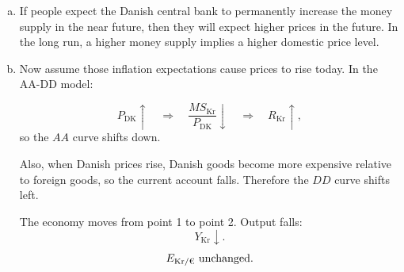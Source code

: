 \documentclass[11pt]{article}
\newenvironment{problem}[2][Problem]{\begin{trivlist}
\item[\hskip \labelsep {\bfseries #1}\hskip \labelsep {\bfseries #2.}]
\leavevmode\par
}{\end{trivlist}}
\newcommand{\Ekr}{E_{\text{Kr}/\text{\texteuro}}}
\begin{document}
\begin{problem}{2}

\begin{enumerate}[(a)]

\item If people expect the Danish central bank to permanently increase the money supply in the near future, then they will expect higher prices in the future. In the long run, a higher money supply implies a higher domestic price level.

\item Now assume those inflation expectations cause prices to rise today. In the AA-DD model:

\[
P_{\text{DK}}\uparrow
\quad \Rightarrow \quad
\frac{MS_{\text{Kr}}}{P_{\text{DK}}}\downarrow
\quad \Rightarrow \quad
R_{\text{Kr}}\uparrow,
\]
so the \(AA\) curve shifts down.

Also, when Danish prices rise, Danish goods become more expensive relative to foreign goods, so the current account falls. Therefore the \(DD\) curve shifts left.

\begin{center}
\end{center}

The economy moves from point 1 to point 2. Output falls:
\[
Y_{\text{Kr}}\downarrow.
\]
\[
\Ekr \text{ unchanged}.
\]


\end{enumerate}
\end{problem}
\end{document}
